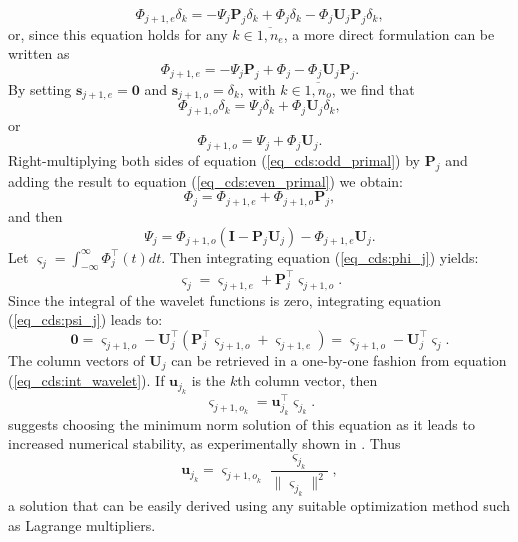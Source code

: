 \documentclass[graybox]{svmult}
\begin{document}
\begin{equation}
\Phi_{j+1,e}\delta_k = -\Psi_j\mathbf{P}_j\delta_k + \Phi_j \delta_k - \Phi_j \mathbf{U}_j\mathbf{P}_j \delta_k,
\end{equation}
or, since this equation holds for any $k \in \overline{1, n_e}$, a more direct formulation can be written as
\begin{equation}
\Phi_{j+1,e}= -\Psi_j\mathbf{P}_j + \Phi_j  - \Phi_j \mathbf{U}_j\mathbf{P}_j.
\label{eq_cds:even_primal}
\end{equation}
By setting $\mathbf{s}_{j+1,e} = \mathbf{0}$ and $\mathbf{s}_{j+1,o} = \delta_k$, with $k \in \overline{1, n_o}$, we find that
\begin{equation}
\Phi_{j+1,o}\delta_k  = \Psi_j \delta_k + \Phi_j \mathbf{U}_j \delta_k,
\end{equation}
or
\begin{equation}
\Phi_{j+1,o} = \Psi_j + \Phi_j \mathbf{U}_j.
\label{eq_cds:odd_primal}
\end{equation}
Right-multiplying both sides of equation (\ref{eq_cds:odd_primal}) by $\mathbf{P}_j$ and adding the result to equation (\ref{eq_cds:even_primal}) we obtain:
\begin{equation}
\Phi_j = \Phi_{j+1,e} + \Phi_{j+1,o} \mathbf{P}_j,
\label{eq_cds:phi_j}
\end{equation}
and then
\begin{equation}
\Psi_j = \Phi_{j+1,o}(\mathbf{I} - \mathbf{P}_j\mathbf{U}_j) - \Phi_{j+1,e}\mathbf{U}_j.
\label{eq_cds:psi_j}
\end{equation}
Let $\varsigma_j = \int_{-\infty}^{\infty}{\Phi_j^\intercal(t) dt}$. Then integrating equation (\ref{eq_cds:phi_j}) yields:
\begin{equation}
\varsigma_j = \varsigma_{j+1,e} + \mathbf{P}_j^\intercal \varsigma_{j+1,o}.
\label{eq_cds:int_scaling}
\end{equation}
Since the integral of the wavelet functions is zero, integrating equation (\ref{eq_cds:psi_j})  leads to:
\begin{equation}
\mathbf{0} = \varsigma_{j+1,o} - \mathbf{U}_j^\intercal \left(\mathbf{P}_j^\intercal \varsigma_{j+1,o} + \varsigma_{j+1,e} \right) = \varsigma_{j+1,o} - \mathbf{U}_j^\intercal \varsigma_j.
\label{eq_cds:int_wavelet}
\end{equation}
The column vectors of $\mathbf{U}_j$ can be retrieved in a one-by-one fashion from equation (\ref{eq_cds:int_wavelet}). If $\mathbf{u}_{j_k}$ is the $k$th column vector, then
\begin{equation}
\varsigma_{{j+1,o}_k} = \mathbf{u}_{j_k}^\intercal \varsigma_{j_k}.
\label{eq_cds:integral_odd_node}
\end{equation}
\cite{Jansen2013} suggests choosing the minimum norm solution of this equation as it leads to increased numerical stability, as experimentally shown in \cite{Cioaca2016}. Thus
\begin{equation}
\mathbf{u}_{j_k} =\varsigma_{{j+1,o}_k} \frac{ \varsigma_{j_k} } { \| \varsigma_{j_k} \|^2 },
\label{eq_cds:update_column_vector}
\end{equation}
a solution that can be easily derived using any suitable optimization method such as Lagrange multipliers.
\end{document}
